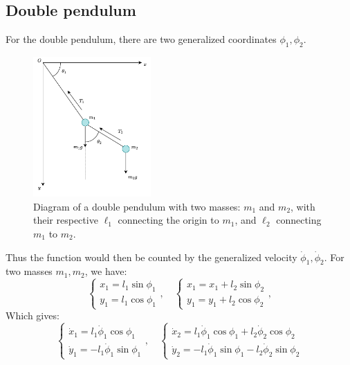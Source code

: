 \subsection{Double pendulum}
For the double pendulum, there are two generalized coordinates $\phi_{1},\phi_{2}$. 
\begin{figure}[htb]
  \centering
  \includegraphics[width=0.4\textwidth]{img/doublependulum.png}
  \caption{Diagram of a double pendulum with two masses: $m_{1}$ and $m_2$, with their respective $\ell_{1}$ connecting the origin to $m_1$, and $\ell_{2}$ connecting $m_1$ to $m_2$.}
  \label{fig:pendulum2a}
\end{figure}
Thus the function would then be counted by the generalized velocity $\dot{\phi}_{1}, \dot{\phi}_{2}$. For two masses $m_{1},m_{2}$, we have:
\begin{equation}
    \begin{cases}
        x_{1} = l_{1} \sin{\phi}_{1}\\
        y_{1} = l_{1} \cos{\phi}_{1}
    \end{cases}, \quad 
    \begin{cases}
        x_{1} = x_{1} + l_{2} \sin{\phi}_{2}\\
        y_{1} = y_{1} +  l_{2} \cos{\phi}_{2}
    \end{cases},
\end{equation}
Which gives: 
\begin{equation}
    \begin{cases}
        \dot{x}_{1} = l_{1}\dot{\phi}_{1}\cos{\phi_{1}}\\ 
        \dot{y}_{1} = -l_{1}\dot{\phi}_{1} \sin{\phi_{1}} 
    \end{cases}, \quad
    \begin{cases}
        \dot{x}_{2} = l_{1}\dot{\phi}_{1}\cos{\phi_{1}} + l_{2}\dot{\phi}_{2}\cos{\phi_{2}} \\ 
        \dot{y}_{2} = -l_{1}\dot{\phi}_{1} \sin{\phi_{1}} -l_{2}\dot{\phi}_{2} \sin{\phi_{2}} 
    \end{cases}
\end{equation}

